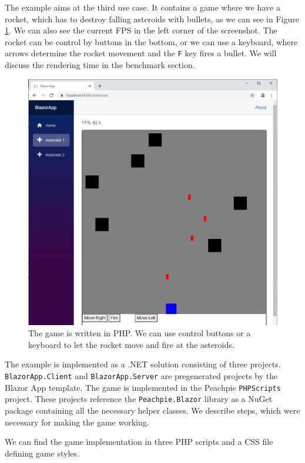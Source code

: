 The example aims at the third use case.
It contains a game where we have a rocket, which has to destroy falling asteroids with bullets, as we can see in Figure \ref{img28:game}.
We can also see the current \ac{FPS} in the left corner of the screenshot.
The rocket can be control by buttons in the bottom, or we can use a keyboard, where arrows determine the rocket movement and the \texttt{F} key fires a bullet.
We will discuss the rendering time in the benchmark section.
\par
\begin{figure}\centering
\includegraphics[scale=0.5]{./img/Asteroids}
\caption{The game is written in PHP. We can use control buttons or a keyboard to let the rocket move and fire at the asteroids.}
\label{img28:game}
\end{figure} 
\par
The example is implemented as a .NET solution consisting of three projects. 
\texttt{BlazorApp.Client} and \texttt{BlazorApp.Server} are pregenerated projects by the Blazor App template.
The game is implemented in the Peachpie \texttt{PHPScripts} project.
These projects reference the \texttt{Peachpie.Blazor} library as a NuGet package containing all the necessary helper classes. 
We describe steps, which were necessary for making the game working.
\par
We can find the game implementation in three PHP scripts and a CSS file defining game styles.
